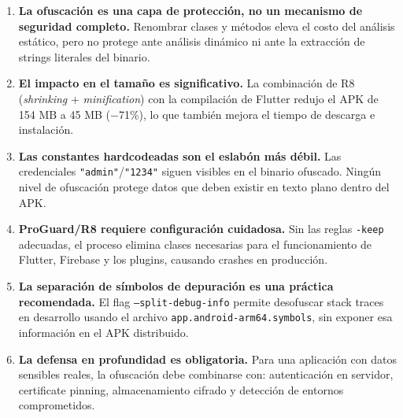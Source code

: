 \documentclass[12pt,a4paper]{article}
\begin{document}
\begin{conclusionbox}
\begin{enumerate}[leftmargin=1.4em]
  \item \textbf{La ofuscación es una capa de protección, no un mecanismo de seguridad completo.} Renombrar clases y métodos eleva el costo del análisis estático, pero no protege ante análisis dinámico ni ante la extracción de strings literales del binario.

  \item \textbf{El impacto en el tamaño es significativo.} La combinación de R8 (\textit{shrinking} + \textit{minification}) con la compilación de Flutter redujo el APK de 154 MB a 45 MB (−71\%), lo que también mejora el tiempo de descarga e instalación.

  \item \textbf{Las constantes hardcodeadas son el eslabón más débil.} Las credenciales \texttt{"admin"}/\texttt{"1234"} siguen visibles en el binario ofuscado. Ningún nivel de ofuscación protege datos que deben existir en texto plano dentro del APK.

  \item \textbf{ProGuard/R8 requiere configuración cuidadosa.} Sin las reglas \texttt{-keep} adecuadas, el proceso elimina clases necesarias para el funcionamiento de Flutter, Firebase y los plugins, causando crashes en producción.

  \item \textbf{La separación de símbolos de depuración es una práctica recomendada.} El flag \texttt{--split-debug-info} permite desofuscar stack traces en desarrollo usando el archivo \texttt{app.android-arm64.symbols}, sin exponer esa información en el APK distribuido.

  \item \textbf{La defensa en profundidad es obligatoria.} Para una aplicación con datos sensibles reales, la ofuscación debe combinarse con: autenticación en servidor, certificate pinning, almacenamiento cifrado y detección de entornos comprometidos.
\end{enumerate}
\end{conclusionbox}
\end{document}
